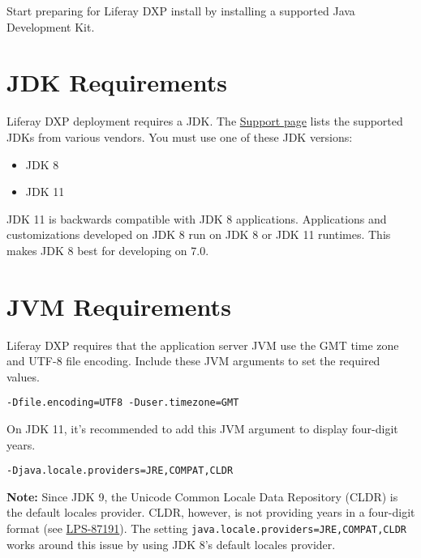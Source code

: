 \noindent\hrulefill

Start preparing for Liferay DXP install by installing a supported Java
Development Kit.

\section{JDK Requirements}\label{jdk-requirements}

Liferay DXP deployment requires a JDK. The
\href{https://help.liferay.com/hc/categories/360000894391-Product-Support}{Support
page} lists the supported JDKs from various vendors. You must use one of
these JDK versions:

\begin{itemize}
\tightlist
\item
  JDK 8
\item
  JDK 11
\end{itemize}

JDK 11 is backwards compatible with JDK 8 applications. Applications and
customizations developed on JDK 8 run on JDK 8 or JDK 11 runtimes. This
makes JDK 8 best for developing on 7.0.

\section{JVM Requirements}\label{jvm-requirements}

Liferay DXP requires that the application server JVM use the GMT time
zone and UTF-8 file encoding. Include these JVM arguments to set the
required values.

\begin{verbatim}
-Dfile.encoding=UTF8 -Duser.timezone=GMT
\end{verbatim}

On JDK 11, it's recommended to add this JVM argument to display
four-digit years.

\begin{verbatim}
-Djava.locale.providers=JRE,COMPAT,CLDR
\end{verbatim}

\noindent\hrulefill

\textbf{Note:} Since JDK 9, the Unicode Common Locale Data Repository
(CLDR) is the default locales provider. CLDR, however, is not providing
years in a four-digit format (see
\href{https://issues.liferay.com/browse/LPS-87191}{LPS-87191}). The
setting \texttt{java.locale.providers=JRE,COMPAT,CLDR} works around this
issue by using JDK 8's default locales provider.

